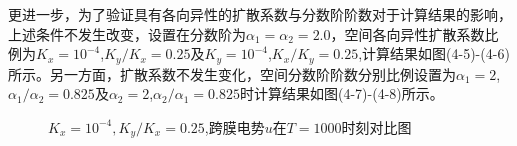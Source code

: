 \documentclass[twoside,UTF8]{nputhesis}
\begin{document}
更进一步，为了验证具有各向异性的扩散系数与分数阶阶数对于计算结果的影响，上述条件不发生改变，设置在分数阶为$\alpha_{1}=\alpha_{2}=2.0$，空间各向异性扩散系数比例为$K_{x}={10}^{-4}$,$K_{y}/K_{x}=0.25$及$K_{y}={10}^{-4}$,$K_{x}/K_{y}=0.25$,计算结果如图(4-5)-(4-6)所示。另一方面，扩散系数不发生变化，空间分数阶阶数分别比例设置为$\alpha_{1}=2$,$\alpha_{1}/\alpha_{2}=0.825$及$\alpha_{2}=2$,$\alpha_{2}/\alpha_{1}=0.825$时计算结果如图(4-7)-(4-8)所示。
\begin{figure}[htbp]
	\centering
	
	\setlength{\abovecaptionskip}{-0.2cm} %
	\caption{$K_{x}=10^{-4},K_{y}/K_{x} = 0.25$,跨膜电势$u$在$T=1000$时刻对比图}
	\label{fig:1a}
	\vspace{-0.5cm} %
	

\end{figure}
\end{document}
